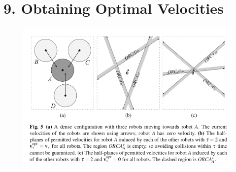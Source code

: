 \documentclass[12pt]{report}
\begin{document}
\chapter*{9.  Obtaining Optimal Velocities}

\begin{figure}[h]
	\centering
	\includegraphics[scale=0.6]{vopt.png}  \label{fig:vopt}
\end{figure}
\end{document}
